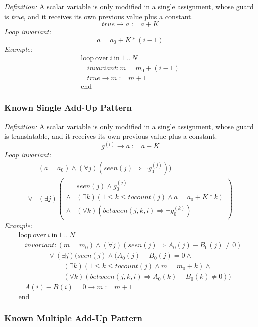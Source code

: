 \documentclass[a4paper,10pt]{article}
\newcommand{\idx}{\ensuremath{i}\xspace}
\newcommand{\at}[1]{{(#1)}}
\newcommand{\KWloop}{\ensuremath{\mathrm{loop}~}}
\newcommand{\KWend}{\ensuremath{\mathrm{end}~}}
\newcommand{\KWover}{\ensuremath{\mathrm{over}~}}
\newcommand{\KWin}{\ensuremath{~\mathrm{in}~}}
\newcommand{\impl}{\ensuremath{\Longrightarrow}}
\newcommand{\seen}[1]{\ensuremath{\mathit{seen}(#1)}\xspace}
\newcommand{\tocount}[1]{\ensuremath{\mathit{tocount}(#1)}\xspace}
\newcommand{\between}[3]{\ensuremath{\mathit{between}{(#1,#2,#3)}}\xspace}
\newcommand{\loopinvariant}{\noindent\textit{Loop invariant:}\xspace}
\newcommand{\patterndef}{\noindent\textit{Definition:}\xspace}
\newcommand{\patternexample}{\noindent\textit{Example:}\xspace}
\begin{document}
\patterndef A scalar variable is only modified in a single assignment, whose
guard is \textit{true}, and it receives its own previous value plus a constant.
%
$$\mathit{true} \rightarrow a := a + K$$
%
\loopinvariant
%
$$a = a_0 + K * (i-1)$$
%
\patternexample
$$\begin{array}{l}
  \KWloop \KWover i \KWin 1~..~N \\
  ~~~~ \textit{invariant}: m = m_0 + (i-1)\\
  ~~~~ true \rightarrow m := m+1\\
  \KWend
\end{array}$$

\subsubsection*{Known Single Add-Up Pattern}

\patterndef A scalar variable is only modified in a single assignment, whose
guard is translatable, and it receives its own previous value plus a constant.
%
$$g^\at{\idx} \rightarrow a := a + K$$
%
\loopinvariant
%
\begin{eqnarray*}
&(a = a_0) \land (\forall j)(\seen{j} \impl \neg g_0^\at{j})) \\
\lor 
& (\exists j)
\left(\begin{array}{cl}
&\seen{j} \land g_0^\at{j}\\
 \land& (\exists k)(1 \leq k \leq \tocount{j} \land a = a_0 + K * k) \\
\land& (\forall k)(\between{j}{k}{\idx} \impl \neg g_0^\at{k})
\end{array}\right)
\end{eqnarray*}
%
\patternexample
$$\begin{array}{l}
  \KWloop \KWover i \KWin 1~..~N \\
  ~~~~ \textit{invariant}: (m = m_0) \land (\forall j)(\seen{j} \impl A_0(j)-B_0(j)\neq0)\\
  ~~~~~~~~~~~~~~~~~~~ \lor (\exists j)(\seen{j} \land (A_0(j)-B_0(j)= 0 \land \\
  ~~~~~~~~~~~~~~~~~~~~~~~~~~~~~ (\exists k)(1 \leq k \leq \tocount{j} \land m = m_0 + k) \land\\
  ~~~~~~~~~~~~~~~~~~~~~~~~~~~~~ (\forall k)(\between{j}{k}{\idx} \impl A_0(k)-B_0(k)\neq0))\\
  ~~~~ A(i)-B(i)=0 \rightarrow m := m+1\\
  \KWend
\end{array}$$

\subsubsection*{Known Multiple Add-Up Pattern}
\end{document}
